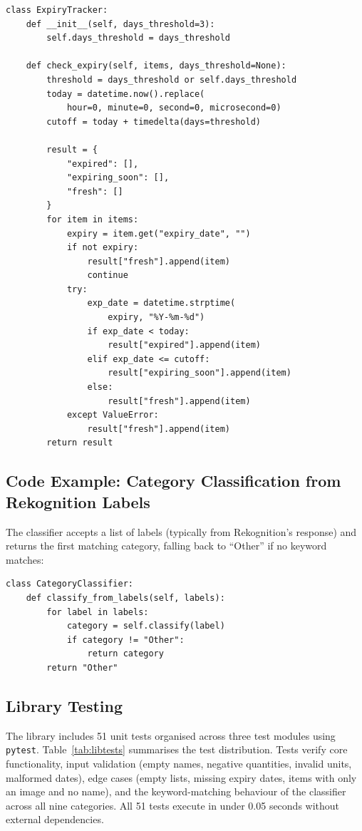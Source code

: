 \documentclass[conference]{IEEEtran}
\begin{document}
\begin{lstlisting}[style=pythonstyle]
class ExpiryTracker:
    def __init__(self, days_threshold=3):
        self.days_threshold = days_threshold

    def check_expiry(self, items, days_threshold=None):
        threshold = days_threshold or self.days_threshold
        today = datetime.now().replace(
            hour=0, minute=0, second=0, microsecond=0)
        cutoff = today + timedelta(days=threshold)

        result = {
            "expired": [],
            "expiring_soon": [],
            "fresh": []
        }
        for item in items:
            expiry = item.get("expiry_date", "")
            if not expiry:
                result["fresh"].append(item)
                continue
            try:
                exp_date = datetime.strptime(
                    expiry, "%Y-%m-%d")
                if exp_date < today:
                    result["expired"].append(item)
                elif exp_date <= cutoff:
                    result["expiring_soon"].append(item)
                else:
                    result["fresh"].append(item)
            except ValueError:
                result["fresh"].append(item)
        return result
\end{lstlisting}

\subsection{Code Example: Category Classification from Rekognition Labels}

The classifier accepts a list of labels (typically from Rekognition's response) and returns the first matching category, falling back to ``Other'' if no keyword matches:

\begin{lstlisting}[style=pythonstyle]
class CategoryClassifier:
    def classify_from_labels(self, labels):
        for label in labels:
            category = self.classify(label)
            if category != "Other":
                return category
        return "Other"
\end{lstlisting}

\subsection{Library Testing}

The library includes 51 unit tests organised across three test modules using \texttt{pytest}. Table~\ref{tab:libtests} summarises the test distribution. Tests verify core functionality, input validation (empty names, negative quantities, invalid units, malformed dates), edge cases (empty lists, missing expiry dates, items with only an image and no name), and the keyword-matching behaviour of the classifier across all nine categories. All 51 tests execute in under 0.05 seconds without external dependencies.
\end{document}

